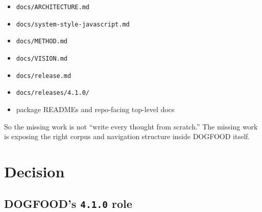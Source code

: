 \begin{itemize}
\tightlist
\item
  \texttt{d\allowbreak{}o\allowbreak{}c\allowbreak{}s\allowbreak{}/\allowbreak{}A\allowbreak{}R\allowbreak{}C\allowbreak{}H\allowbreak{}I\allowbreak{}T\allowbreak{}E\allowbreak{}C\allowbreak{}T\allowbreak{}U\allowbreak{}R\allowbreak{}E\allowbreak{}.\allowbreak{}m\allowbreak{}d}
\item
  \texttt{d\allowbreak{}o\allowbreak{}c\allowbreak{}s\allowbreak{}/\allowbreak{}s\allowbreak{}y\allowbreak{}s\allowbreak{}t\allowbreak{}e\allowbreak{}m\allowbreak{}-\allowbreak{}s\allowbreak{}t\allowbreak{}y\allowbreak{}l\allowbreak{}e\allowbreak{}-\allowbreak{}j\allowbreak{}a\allowbreak{}v\allowbreak{}a\allowbreak{}s\allowbreak{}c\allowbreak{}r\allowbreak{}i\allowbreak{}p\allowbreak{}t\allowbreak{}.\allowbreak{}m\allowbreak{}d}
\item
  \texttt{d\allowbreak{}o\allowbreak{}c\allowbreak{}s\allowbreak{}/\allowbreak{}M\allowbreak{}E\allowbreak{}T\allowbreak{}H\allowbreak{}O\allowbreak{}D\allowbreak{}.\allowbreak{}m\allowbreak{}d}
\item
  \texttt{d\allowbreak{}o\allowbreak{}c\allowbreak{}s\allowbreak{}/\allowbreak{}V\allowbreak{}I\allowbreak{}S\allowbreak{}I\allowbreak{}O\allowbreak{}N\allowbreak{}.\allowbreak{}m\allowbreak{}d}
\item
  \texttt{d\allowbreak{}o\allowbreak{}c\allowbreak{}s\allowbreak{}/\allowbreak{}r\allowbreak{}e\allowbreak{}l\allowbreak{}e\allowbreak{}a\allowbreak{}s\allowbreak{}e\allowbreak{}.\allowbreak{}m\allowbreak{}d}
\item
  \texttt{d\allowbreak{}o\allowbreak{}c\allowbreak{}s\allowbreak{}/\allowbreak{}r\allowbreak{}e\allowbreak{}l\allowbreak{}e\allowbreak{}a\allowbreak{}s\allowbreak{}e\allowbreak{}s\allowbreak{}/\allowbreak{}4\allowbreak{}.\allowbreak{}1\allowbreak{}.\allowbreak{}0\allowbreak{}/}
\item
  package READMEs and repo-facing top-level docs
\end{itemize}

So the missing work is not ``write every thought from scratch.'' The missing work is exposing the right corpus and navigation structure inside DOGFOOD itself.

\section{Decision}\label{record-082-decision}

\subsection{\texorpdfstring{DOGFOOD's \texttt{4\allowbreak{}.\allowbreak{}1\allowbreak{}.\allowbreak{}0} role}{DOGFOOD's  role}}\label{record-082-dogfoods-4.1.0-role}

